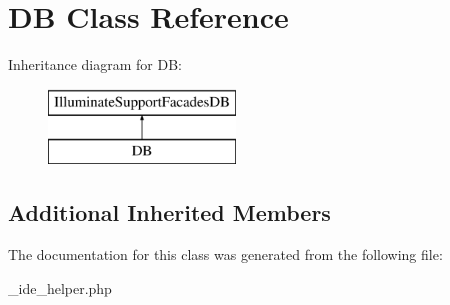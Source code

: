 \hypertarget{class_d_b}{}\section{DB Class Reference}
\label{class_d_b}
Inheritance diagram for DB\+:\begin{figure}[H]
\begin{center}
\leavevmode
\includegraphics[height=2.000000cm]{class_d_b}
\end{center}
\end{figure}
\subsection*{Additional Inherited Members}


The documentation for this class was generated from the following file\+:\begin{DoxyCompactItemize}
\item 
\+\_\+ide\+\_\+helper.\+php\end{DoxyCompactItemize}

